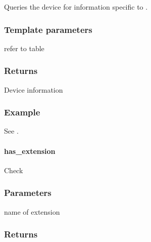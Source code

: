 \documentclass[letterpaper,10pt,english]{sphinxmanual}
\begin{document}
Queries the device for information specific to .
\subsubsection*{Template parameters}

 \sphinxhyphen{} refer to  table
\subsubsection*{Returns}

Device information
\subsubsection*{Example}

See {\hyperref[\detokenize{programming-interface/runtime/platform:platform-example}]{}}.


\paragraph{has\_extension}
\label{\detokenize{programming-interface/runtime/device:has-extension}}
\begin{sphinxVerbatim}[commandchars=\\\{\}]
    
\end{sphinxVerbatim}

Check
\subsubsection*{Parameters}

 \sphinxhyphen{} name of extension
\subsubsection*{Returns}
\end{document}

